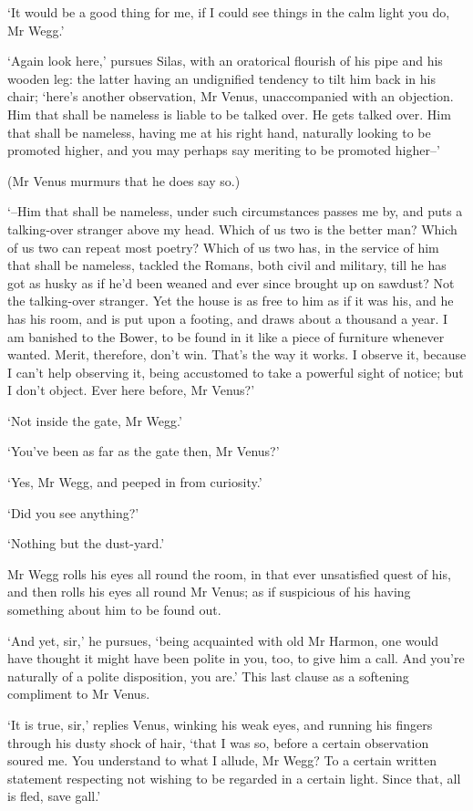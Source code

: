 ‘It would be a good thing for me, if I could see things in the calm
light you do, Mr Wegg.’

‘Again look here,’ pursues Silas, with an oratorical flourish of his
pipe and his wooden leg: the latter having an undignified tendency
to tilt him back in his chair; ‘here’s another observation, Mr Venus,
unaccompanied with an objection. Him that shall be nameless is liable to
be talked over. He gets talked over. Him that shall be nameless, having
me at his right hand, naturally looking to be promoted higher, and you
may perhaps say meriting to be promoted higher--’

(Mr Venus murmurs that he does say so.)

‘--Him that shall be nameless, under such circumstances passes me by,
and puts a talking-over stranger above my head. Which of us two is the
better man? Which of us two can repeat most poetry? Which of us two has,
in the service of him that shall be nameless, tackled the Romans, both
civil and military, till he has got as husky as if he’d been weaned and
ever since brought up on sawdust? Not the talking-over stranger. Yet the
house is as free to him as if it was his, and he has his room, and is
put upon a footing, and draws about a thousand a year. I am banished to
the Bower, to be found in it like a piece of furniture whenever wanted.
Merit, therefore, don’t win. That’s the way it works. I observe it,
because I can’t help observing it, being accustomed to take a powerful
sight of notice; but I don’t object. Ever here before, Mr Venus?’

‘Not inside the gate, Mr Wegg.’

‘You’ve been as far as the gate then, Mr Venus?’

‘Yes, Mr Wegg, and peeped in from curiosity.’

‘Did you see anything?’

‘Nothing but the dust-yard.’

Mr Wegg rolls his eyes all round the room, in that ever unsatisfied
quest of his, and then rolls his eyes all round Mr Venus; as if
suspicious of his having something about him to be found out.

‘And yet, sir,’ he pursues, ‘being acquainted with old Mr Harmon, one
would have thought it might have been polite in you, too, to give him a
call. And you’re naturally of a polite disposition, you are.’ This last
clause as a softening compliment to Mr Venus.

‘It is true, sir,’ replies Venus, winking his weak eyes, and running
his fingers through his dusty shock of hair, ‘that I was so, before a
certain observation soured me. You understand to what I allude, Mr Wegg?
To a certain written statement respecting not wishing to be regarded in
a certain light. Since that, all is fled, save gall.’

